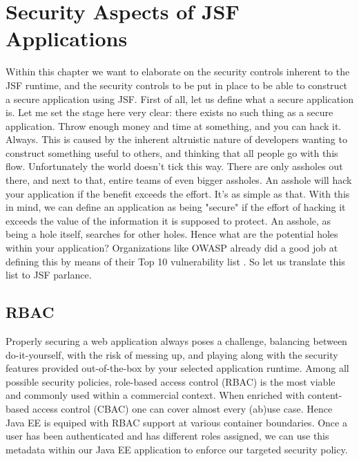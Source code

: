 %

\chapter{Security Aspects of JSF Applications}
Within this chapter we want to elaborate on the security controls inherent to the JSF runtime, and the security controls to be put in place to be able to construct a secure application using JSF.
First of all, let us define what a secure application is.
Let me set the stage here very clear: there exists no such thing as a secure application.
Throw enough money and time at something, and you can hack it.
Always.
This is caused by the inherent altruistic nature of developers wanting to construct something useful to others, and thinking that all people go with this flow.
Unfortunately the world doesn't tick this way.
There are only assholes out there, and next to that, entire teams of even bigger assholes.
An asshole will hack your application if the benefit exceeds the effort.
It's as simple as that.
With this in mind, we can define an application as being "secure" if the effort of hacking it exceeds the value of the information it is supposed to protect.
An asshole, as being a hole itself, searches for other holes.
Hence what are the potential holes within your application?
Organizations like OWASP already did a good job at defining this by means of their Top 10 vulnerability list \cite{owasp-top-ten}.
So let us translate this list to JSF parlance.


\section{RBAC}
Properly securing a web application always poses a challenge,
balancing between do-it-yourself, with the risk of messing up,
and playing along with the security features provided out-of-the-box by your selected application runtime.
Among all possible security policies,
role-based access control (RBAC) is the most viable and commonly used within a commercial context.
When enriched with content-based access control (CBAC) one can cover almost every (ab)use case.
Hence Java EE is equiped with RBAC support at various container boundaries.
Once a user has been authenticated and has different roles assigned,
we can use this metadata within our Java EE application to enforce our targeted security policy.

